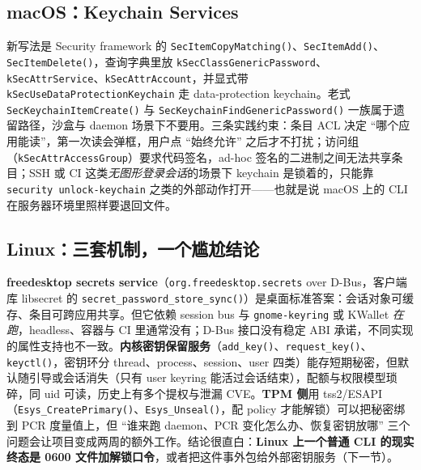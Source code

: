 \documentclass[12pt,a4paper,fontset=fandol]{ctexbook}
\newcommand{\Fn}[1]{\texttt{#1()}}
\newcommand{\Tp}[1]{\texttt{#1}}
\begin{document}
\subsection{macOS：Keychain Services}

新写法是 Security framework 的 \Fn{Sec\allowbreak{}Item\allowbreak{}Copy\allowbreak{}Matching}、\Fn{SecItemAdd}、\Fn{Sec\allowbreak{}Item\allowbreak{}Delete}，查询字典里放 \Tp{k\allowbreak{}Sec\allowbreak{}Class\allowbreak{}Generic\allowbreak{}Password}、\Tp{k\allowbreak{}Sec\allowbreak{}Attr\allowbreak{}Service}、\Tp{k\allowbreak{}Sec\allowbreak{}Attr\allowbreak{}Account}，并显式带 \Tp{k\allowbreak{}Sec\allowbreak{}Use\allowbreak{}Data\allowbreak Protection\allowbreak{}Keychain} 走 data-protection keychain。老式 \Fn{Sec\allowbreak{}Keychain\allowbreak{}Item\allowbreak{}Create} 与 \Fn{Sec\allowbreak{}Keychain\allowbreak{}Find\allowbreak Generic\allowbreak{}Password} 一族属于遗留路径，沙盒与 daemon 场景下不要用。三条实践约束：条目 ACL 决定 ``哪个应用能读''，第一次读会弹框，用户点 ``始终允许'' 之后才不打扰；访问组（\Tp{k\allowbreak{}Sec\allowbreak{}Attr\allowbreak{}Access\allowbreak{}Group}）要求代码签名，ad-hoc 签名的二进制之间无法共享条目；SSH 或 CI 这类\emph{无图形登录会话}的场景下 keychain 是锁着的，只能靠 \texttt{security unlock-\allowbreak{}keychain} 之类的外部动作打开——也就是说 macOS 上的 CLI 在服务器环境里照样要退回文件。

\subsection{Linux：三套机制，一个尴尬结论}

\textbf{freedesktop secrets service}（\Tp{org.\allowbreak freedesktop.secrets} over D-Bus，客户端库 libsecret 的 \Fn{secret\_password\_\allowbreak store\_sync}）是桌面标准答案：会话对象可缓存、条目可跨应用共享。但它依赖 session bus 与 \Tp{gnome-keyring} 或 KWallet \emph{在跑}，headless、容器与 CI 里通常没有；D-Bus 接口没有稳定 ABI 承诺，不同实现的属性支持也不一致。\textbf{内核密钥保留服务}（\Fn{add\_key}、\Fn{request\_key}、\Fn{keyctl}，密钥环分 thread、process、session、user 四类）能存短期秘密，但默认随引导或会话消失（只有 user keyring 能活过会话结束），配额与权限模型琐碎，同 uid 可读，历史上有多个提权与泄漏 CVE。\textbf{TPM 侧}用 tss2/ESAPI（\Fn{Esys\_CreatePrimary}、\Fn{Esys\_Unseal}，配 policy 才能解锁）可以把秘密绑到 PCR 度量值上，但 ``谁来跑 daemon、PCR 变化怎么办、恢复密钥放哪'' 三个问题会让项目变成两周的额外工作。结论很直白：\textbf{Linux 上一个普通 CLI 的现实终态是 0600 文件加解锁口令}，或者把这件事外包给外部密钥服务（下一节）。
\end{document}
